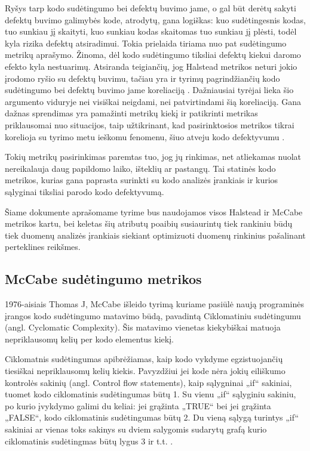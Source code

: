 \documentclass{VUMIFPSbakalaurinis}
\begin{document}
Ryšys tarp kodo sudėtingumo bei defektų buvimo jame, o gal būt derėtų sakyti defektų buvimo galimybės kode, atrodytų, gana logiškas: kuo sudėtingesnis kodas, tuo sunkiau jį skaityti, kuo sunkiau kodas skaitomas tuo sunkiau jį plėsti, todėl kyla rizika defektų atsiradimui. Tokia prielaida tiriama nuo pat sudėtingumo metrikų aprašymo. Žinoma, dėl kodo sudėtingumo tiksliai defektų kiekui daromo efekto kyla nestuarimų. Atsiranda teigiančių, jog Halstead metrikos neturi jokio įrodomo ryšio su defektų buvimu, tačiau yra ir tyrimų pagrindžiančių kodo sudėtingumo bei defektų buvimo jame koreliaciją \cite{Schroeder1999APG}. Dažniausiai tyrėjai lieka šio argumento viduryje nei visiškai neigdami, nei patvirtindami šią koreliaciją. Gana dažnas sprendimas yra pamažinti metrikų kiekį ir patikrinti metrikas priklausomai nuo situacijos, taip užtikrinant, kad pasirinktosios metrikos tikrai korelioja su tyrimo metu ieškomu fenomenu, šiuo atveju kodo defektyvumu \cite{MetricsinEvaluatingSoftwareDefects:2013}.

Tokių metrikų pasirinkimas paremtas tuo, jog jų rinkimas, net atliekamas nuolat nereikalauja daug papildomo laiko, išteklių ar pastangų. Tai statinės kodo metrikos, kurias gana paprasta surinkti su kodo analizės įrankiais ir kurios sąlyginai tiksliai parodo kodo defektyvumą.

Šiame dokumente aprašomame tyrime bus naudojamos visos Halstead ir McCabe metrikos kartu, bei keletas šių atributų poaibių susiaurintų tiek rankiniu būdų tiek duomenų analizės įrankiais siekiant optimizuoti duomenų rinkinius pašalinant perteklines reikšmes.

\subsection{McCabe sudėtingumo metrikos}
1976-aisiais Thomas J, McCabe išleido tyrimą kuriame pasiūlė naują programinės įrangos kodo sudėtingumo matavimo būdą, pavadintą Ciklomatiniu sudėtingumu (angl. Cyclomatic Complexity). Šis matavimo vienetas kiekybiškai matuoja nepriklausomų kelių per kodo elementus kiekį.

Ciklomatnis sudėtingumas apibrėžiamas, kaip kodo vykdyme egzistuojančių tiesiškai nepriklausomų kelių kiekis. Pavyzdžiui jei kode nėra jokių eiliškumo kontrolės sakinių (angl. Control flow statements), kaip sąlygninai „if“ sakiniai, tuomet kodo ciklomatinis sudėtingumas būtų 1. Su vienu „if“ sąlyginiu sakiniu, po kurio įvykdymo galimi du keliai: jei grąžinta „TRUE“ bei jei grąžinta „FALSE“, kodo ciklomatinis sudėtingumas būtų 2. Du vieną sąlygą turintys „if“ sakiniai ar vienas toks sakinys su dviem salygomis sudarytų grafą kurio ciklomatinis sudėtingmas būtų lygus 3 ir t.t. \cite{McCabe:1976:CM:800253.807712}.
\end{document}
